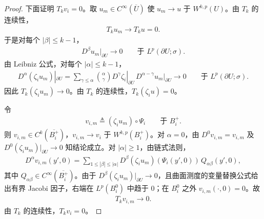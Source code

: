 \begin{proof}
下面证明 $T_{k}v_{i}=0$。取 $u_{m}\in C^{\infty}(\overline{U})$ 使 $u_{m}\to u$ 于 $W^{k,p}(U)$。由 $T_{k}$ 的连续性，
\begin{align*}
T_{k}u_{m}\longrightarrow T_{k}u=0.
\end{align*}
于是对每个 $|\beta|\leqslant k-1$，
\begin{align*}
D^{\beta}u_{m}|_{\partial U}\longrightarrow0
\qquad\text{于 }L^{p}(\partial U;\sigma).
\end{align*}
由 Leibniz 公式，对每个 $|\alpha|\leqslant k-1$，
\begin{align*}
D^{\alpha}(\zeta_{i}u_{m})|_{\partial U}
=\sum_{\gamma\leqslant\alpha}
\binom{\alpha}{\gamma}
D^{\gamma}\zeta_{i}|_{\partial U}\,
D^{\alpha-\gamma}u_{m}|_{\partial U}
\longrightarrow0
\qquad\text{于 }L^{p}(\partial U;\sigma).
\end{align*}
因此 $T_{k}(\zeta_{i}u_{m})\to0$。由 $T_{k}$ 的连续性，$T_{k}(\zeta_{i}u)=0$。

令
\begin{align*}
v_{i,m}\triangleq(\zeta_{i}u_{m})\circ\Psi_{i}
\qquad\text{于 }B_{i}^{+}.
\end{align*}
则 $v_{i,m}\in C^{k}(\overline{B_{i}^{+}})$，$v_{i,m}\to v_{i}$ 于 $W^{k,p}(B_{i}^{+})$。对 $\alpha=0$，由 $D^{0}v_{i,m}=v_{i,m}$ 及 $D^{0}(\zeta_{i}u_{m})|_{\partial U}\to0$ 知结论成立。对 $|\alpha|\geqslant1$，由链式法则，
\begin{align*}
D^{\alpha}v_{i,m}(y',0)
=
\sum_{1\leqslant|\beta|\leqslant|\alpha|}
D^{\beta}(\zeta_{i}u_{m})(\Psi_{i}(y',0))\,
Q_{\alpha\beta}(y',0),
\end{align*}
其中 $Q_{\alpha\beta}\in C^{\infty}(\overline{B_{i}^{+}})$。由于 $D^{\beta}(\zeta_{i}u_{m})|_{\partial U}\to0$，且曲面测度的变量替换公式给出有界 Jacobi 因子，右端在 $L^{p}(B_{i}^{0})$ 中趋于 $0$；在 $B_{i}^{0}$ 之外 $v_{i,m}(\cdot,0)=0$。故
\begin{align*}
T_{k}v_{i,m}\longrightarrow0.
\end{align*}
由 $T_{k}$ 的连续性，$T_{k}v_{i}=0$。


\end{proof}
